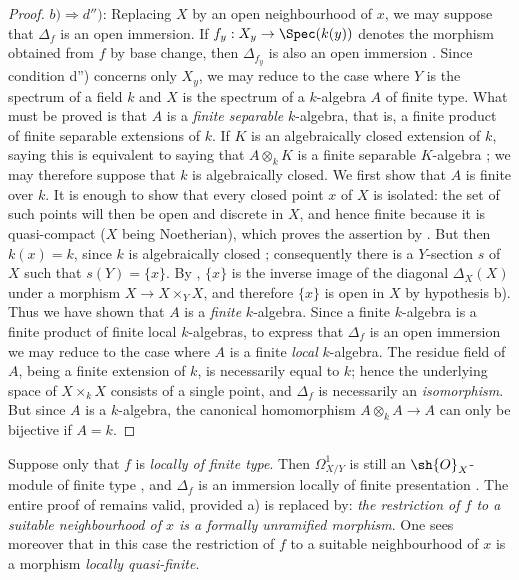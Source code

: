 \begin{proof}
$b)\Rightarrow d'')$: Replacing $X$ by an open neighbourhood of $x$, we may suppose that $\Delta_f$ is an open immersion. If $f_y:X_y\to\Spec(k(y))$ denotes the morphism obtained from $f$ by base change, then $\Delta_{f_y}$ is also an open immersion . Since condition d'') concerns only $X_y$, we may reduce to the case where $Y$ is the spectrum of a field $k$ and $X$ is the spectrum of a $k$-algebra $A$ of finite type. What must be proved is that $A$ is a \emph{finite separable} $k$-algebra, that is, a finite product of finite separable extensions of $k$.
If $K$ is an algebraically closed extension of $k$, saying this is equivalent to saying that $A\otimes_k K$ is a finite separable $K$-algebra ; we may therefore suppose that $k$ is algebraically closed. We first show that $A$ is finite over $k$. It is enough to show that every closed point $x$ of $X$ is isolated: the set of such points will then be open and discrete in $X$, and hence finite because it is quasi-compact ($X$ being Noetherian), which proves the assertion by . But then $k(x)=k$, since $k$ is algebraically closed ; consequently there is a $Y$-section $s$ of $X$ such that $s(Y)=\{x\}$. By , $\{x\}$ is the inverse image of the diagonal $\Delta_X(X)$ under a morphism $X\to X\times_Y X$, and therefore $\{x\}$ is open in $X$ by hypothesis b). Thus we have shown that $A$ is a
\emph{finite} $k$-algebra.
Since a finite $k$-algebra is a finite product of finite local $k$-algebras, to express that $\Delta_f$ is an open immersion we may reduce to the case where $A$ is a finite \emph{local} $k$-algebra. The residue field of $A$, being a finite extension of $k$, is necessarily equal to $k$; hence  the underlying space of $X\times_k X$ consists of a single point, and $\Delta_f$ is necessarily an \emph{isomorphism}.
But since $A$ is a $k$-algebra, the canonical homomorphism $A\otimes_k A\to A$ can only be bijective if $A=k$.
\end{proof}

\begin{remark}[17.4.2]
\label{IV.17.4.2}
Suppose only that $f$ is \emph{locally of finite type}.
Then $\Omega^1_{X/Y}$ is still an $\sh{O}_X$-module of finite type , and $\Delta_f$ is an immersion locally of finite presentation .
The entire proof of  remains valid, provided a) is replaced by: \emph{the restriction of $f$ to a suitable neighbourhood of $x$ is a formally unramified morphism}.
One sees moreover that in this case the restriction of $f$ to a suitable neighbourhood of $x$ is a morphism \emph{locally quasi-finite}.
\end{remark}

